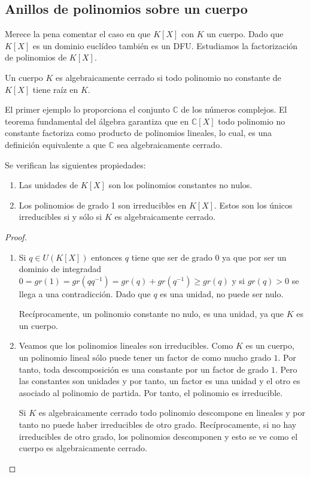 \subsection{Anillos de polinomios sobre un cuerpo}

Merece la pena comentar el caso en que $K[X]$ con $K$ un cuerpo. Dado que $K[X]$ es un dominio euclídeo también es un DFU. Estudiamos la factorización de polinomios de $K[X]$.

\begin{definition}
Un cuerpo $K$ es algebraicamente cerrado si todo polinomio no constante de $K[X]$ tiene raíz en $K$.
\end{definition}

\begin{example}
El primer ejemplo lo proporciona el conjunto $\mathbb{C}$ de los números complejos. El teorema fundamental del álgebra garantiza que en $\mathbb{C}[X]$ todo polinomio no constante factoriza como producto de polinomios lineales, lo cual, es una definición equivalente a que $\mathbb{C}$ sea algebraicamente cerrado. 
\end{example}

\begin{proposition}
Se verifican las siguientes propiedades:

\begin{enumerate}
\item Las unidades de $K[X]$ son los polinomios constantes no nulos.
\item Los polinomios de grado 1 son irreducibles en $K[X]$. Estos son los únicos irreducibles si y sólo si $K$ es algebraicamente cerrado.
\end{enumerate}
\end{proposition}
\begin{proof}
\begin{enumerate}
\item Si $q \in U(K[X])$ entonces $q$ tiene que ser de grado $0$ ya que por ser un dominio de integradad $0 = gr(1) = gr(qq^{-1}) = gr(q) + gr(q^{-1}) \ge gr(q)$ y si $gr(q) > 0$ se llega a una contradicción. Dado que $q$ es una unidad, no puede ser nulo. 

Recíprocamente, un polinomio constante no nulo, es una unidad, ya que $K$ es un cuerpo.  
\item Veamos que los polinomios lineales son irreducibles. Como $K$ es un cuerpo, un polinomio lineal sólo puede tener un factor de como mucho grado $1$. Por tanto, toda descomposición es una constante por un factor de grado $1$. Pero las constantes son unidades y por tanto, un factor es una unidad y el otro es asociado al polinomio de partida. Por tanto, el polinomio es irreducible. 

Si $K$ es algebraicamente cerrado todo polinomio descompone en lineales y por tanto no puede haber irreducibles de otro grado. Recíprocamente, si no hay irreducibles de otro grado, los polinomios descomponen y esto se ve como el cuerpo es algebraicamente cerrado. 
\end{enumerate}
\end{proof}

